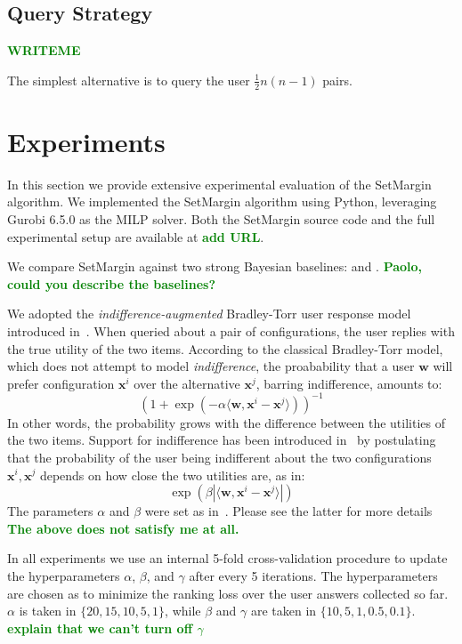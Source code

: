 \documentclass{article}
\renewcommand\[{\begin{equation}}
\renewcommand\]{\end{equation}}
\newcommand{\vecvar}[1]{\ensuremath{\boldsymbol{#1}}}
\newcommand{\vw}{\vecvar{w}}
\newcommand{\vx}{\vecvar{x}}
\newcommand{\stefano}[1]{{\bf \textcolor{green}{{\fbox{Stefano:} #1}}}}
\begin{document}
\subsection{Query Strategy}
\label{sec:querystrategy}

\stefano{WRITEME}

The simplest alternative is to query the user $\frac{1}{2}n(n-1)$ pairs.

\section{Experiments}
\label{sec:experiments}

In this section we provide extensive experimental evaluation of the {\sc
SetMargin} algorithm. We implemented the {\sc SetMargin} algorithm using
Python, leveraging Gurobi 6.5.0 as the MILP solver. Both the {\sc SetMargin}
source code and the full experimental setup are available at \stefano{add URL}.

We compare {\sc SetMargin} against two strong Bayesian baselines:
\cite{guo2010real} and \cite{viappiani2010optimal}.
\stefano{Paolo, could you describe the baselines?}

We adopted the {\em indifference-augmented} Bradley-Torr user response model
introduced in~\cite{guo2010real}. When queried about a pair of configurations,
the user replies with the true utility of the two items. According to the
classical Bradley-Torr model, which does not attempt to model {\em indifference},
the proabability that a user $\vw$ will prefer configuration $\vx^i$ over
the alternative $\vx^j$, barring indifference, amounts to:
%
$$ (1 + \exp(-\alpha \langle\vw,\vx^i - \vx^j\rangle))^{-1} $$
%
In other words, the probability grows with the difference between the utilities
of the two items. Support for indifference has been introduced
in~\cite{guo2010real} by postulating that the probability of the user being
indifferent about the two configurations $\vx^i, \vx^j$ depends on how close
the two utilities are, as in:
%
$$ \exp(\beta |\langle\vw,\vx^i - \vx^j\rangle|) $$
%
The parameters $\alpha$ and $\beta$ were set as in~\cite{guo2010real}. Please
see the latter for more details
\stefano{The above does not satisfy me at all.}

In all experiments we use an internal 5-fold cross-validation procedure to update the
hyperparameters $\alpha$, $\beta$, and $\gamma$ after every 5 iterations. The
hyperparameters are chosen as to minimize the ranking loss over the user
answers collected so far. $\alpha$ is taken in $\{20, 15, 10, 5, 1\}$,
while $\beta$ and $\gamma$ are taken in $\{10, 5, 1, 0.5, 0.1\}$.
\stefano{explain that we can't turn off $\gamma$}
\end{document}
